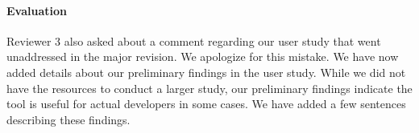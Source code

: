 \documentclass[10pt]{article}
\begin{document}
\paragraph{Evaluation}
Reviewer 3 also asked about a comment regarding our user study that went
unaddressed in the major revision. We apologize for this mistake. We have now
added details about our preliminary findings in the user study. While we did not
have the resources to conduct a larger study, our preliminary findings indicate
the tool is useful for actual developers in some cases. We have added a few
sentences describing these findings.




\end{document}
